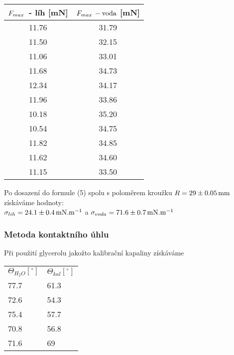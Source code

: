 \documentclass[czech,11pt,a4paper]{article}
\begin{document}
   \begin{center}
   	\begin{tabular}{c|c}
   		\hline
   		$F_{max} \,\rm $ - líh [mN] & $F_{max} \,\rm - voda$ [mN]\\ 
   		\hline
   		11.76               & 31.79                \\
   		11.50               & 32.15                \\
   		11.06               & 33.01                \\
   		11.68               & 34.73                \\
   		12.34               & 34.17                \\
   		11.96               & 33.86                \\
   		10.18               & 35.20                \\
   		10.54               & 34.75                \\
   		11.82               & 34.85                \\
   		11.62               & 34.60                \\
   		11.15               & 33.50               
   	\end{tabular}
   \end{center}
   Po dosazení do formule (5) spolu s poloměrem kroužku $R = 29 \pm 0.05\,\rm mm$ získáváme hodnoty:\\ $\sigma_{lih} = 24.1 \pm 0.4 \,\rm mN.m^{-1}$ a $\sigma_{voda} = 71.6 \pm 0.7 \,\rm mN.m^{-1}$
   
   
   \subsubsection{Metoda kontaktního úhlu}
   Při použití glycerolu jakožto kalibrační kapaliny získáváme
   
   \begin{center}
   	\begin{tabular}{l|l}
   	\hline
   	$\Theta_{H_2O}[^\circ]$ & $\Theta_{kal} [^\circ]$ \\
   	77.7                    & 61.3                    \\
   	72.6                    & 54.3                    \\
   	75.4                    & 57.7                    \\
   	70.8                    & 56.8                    \\
   	71.6                    & 69                     
   \end{tabular}
   \end{center}
   
\end{document}
